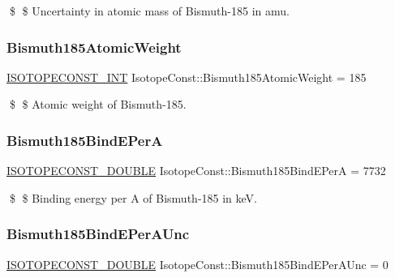 \$ \$ Uncertainty in atomic mass of Bismuth-\/185 in amu. \mbox{\label{group___isotope_const-_bismuth-_bi185_gaf7902eb77c7c5920ceb93648a4012c66}} 
\subsubsection{\texorpdfstring{Bismuth185\+Atomic\+Weight}{Bismuth185AtomicWeight}}
{\footnotesize\ttfamily \mbox{\hyperlink{group___isotope_const-_macros_ga5f18360b3e99483a35c32d789e62621c}{I\+S\+O\+T\+O\+P\+E\+C\+O\+N\+S\+T\+\_\+\+I\+NT}} Isotope\+Const\+::\+Bismuth185\+Atomic\+Weight = 185}

\$ \$ Atomic weight of Bismuth-\/185. \mbox{\label{group___isotope_const-_bismuth-_bi185_gae988b9a2e6cd505c5522c75ff42fff62}} 
\subsubsection{\texorpdfstring{Bismuth185\+Bind\+E\+PerA}{Bismuth185BindEPerA}}
{\footnotesize\ttfamily \mbox{\hyperlink{group___isotope_const-_macros_ga8f45a7272ce02c0b4c65c44636ed719a}{I\+S\+O\+T\+O\+P\+E\+C\+O\+N\+S\+T\+\_\+\+D\+O\+U\+B\+LE}} Isotope\+Const\+::\+Bismuth185\+Bind\+E\+PerA = 7732}

\$ \$ Binding energy per A of Bismuth-\/185 in keV. \mbox{\label{group___isotope_const-_bismuth-_bi185_gafd89aa6581e34772fd783df33ba6f175}} 
\subsubsection{\texorpdfstring{Bismuth185\+Bind\+E\+Per\+A\+Unc}{Bismuth185BindEPerAUnc}}
{\footnotesize\ttfamily \mbox{\hyperlink{group___isotope_const-_macros_ga8f45a7272ce02c0b4c65c44636ed719a}{I\+S\+O\+T\+O\+P\+E\+C\+O\+N\+S\+T\+\_\+\+D\+O\+U\+B\+LE}} Isotope\+Const\+::\+Bismuth185\+Bind\+E\+Per\+A\+Unc = 0}

